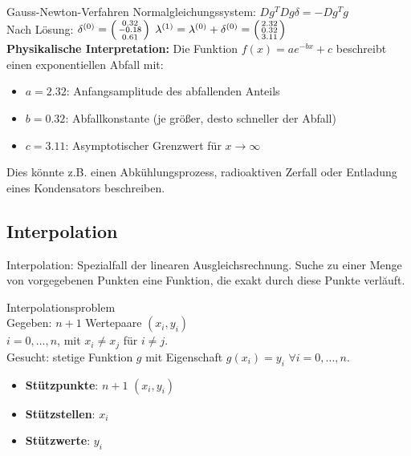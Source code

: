 \begin{example2}{Gauss-Newton-Verfahren}
Normalgleichungssystem: $Dg^T Dg \delta = -Dg^T g$
\vspace{2mm}\\
Nach Lösung: $\delta^{(0)} = \begin{psmallmatrix} 0.32 \\ -0.18 \\ 0.61 \end{psmallmatrix}$
$\lambda^{(1)} = \lambda^{(0)} + \delta^{(0)} = \begin{psmallmatrix} 2.32 \\ 0.32 \\ 3.11 \end{psmallmatrix}$
\vspace{2mm}\\
\textbf{Physikalische Interpretation:}
Die Funktion $f(x) = ae^{-bx} + c$ beschreibt einen exponentiellen Abfall mit:
\begin{itemize}
    \item $a = 2.32$: Anfangsamplitude des abfallenden Anteils
    \item $b = 0.32$: Abfallkonstante (je größer, desto schneller der Abfall)
    \item $c = 3.11$: Asymptotischer Grenzwert für $x \rightarrow \infty$
\end{itemize}
Dies könnte z.B. einen Abkühlungsprozess, radioaktiven Zerfall oder Entladung eines Kondensators beschreiben.
\end{example2}

\subsection{Interpolation}

\begin{remark}
Interpolation: Spezialfall der linearen Ausgleichsrechnung. Suche zu einer Menge von vorgegebenen Punkten eine Funktion, die exakt durch diese Punkte verlăuft.
\end{remark}

\begin{definition}{Interpolationsproblem}\\
Gegeben: $n+1$ Wertepaare $(x_i, y_i)$\\ $i = 0, ..., n$, mit $x_i \neq x_j$ für $i \neq j$. 
\vspace{2mm}\\
Gesucht: stetige Funktion $g$ mit Eigenschaft $g(x_i) = y_i$ $\forall i = 0, ..., n$.
\begin{itemize}
    \item \textbf{Stützpunkte}: $n+1$ $(x_i, y_i)$ 
    \item \textbf{Stützstellen}: $x_i$
    \item \textbf{Stützwerte}: $y_i$
\end{itemize}
\end{definition}

